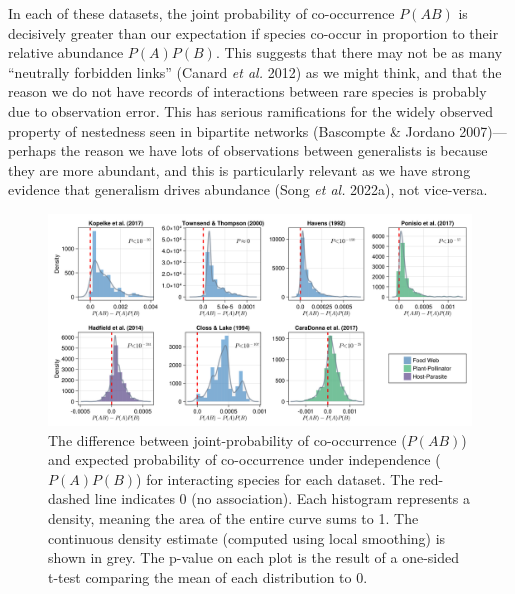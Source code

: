 \documentclass[10pt,oneside]{article}
\makeatletter
\def\maxwidth{\ifdim\Gin@nat@width>\linewidth\linewidth
\else\Gin@nat@width\fi}
\let\Oldincludegraphics\includegraphics
\renewcommand{\includegraphics}[1]{\Oldincludegraphics[width=\maxwidth]{#1}}
\makeatother
\begin{document}
In each of these datasets, the joint probability of co-occurrence
\(P(AB)\) is decisively greater than our expectation if species co-occur
in proportion to their relative abundance \(P(A)P(B)\). This suggests
that there may not be as many ``neutrally forbidden links'' (Canard
\emph{et al.} 2012) as we might think, and that the reason we do not
have records of interactions between rare species is probably due to
observation error. This has serious ramifications for the widely
observed property of nestedness seen in bipartite networks (Bascompte \&
Jordano 2007)---perhaps the reason we have lots of observations between
generalists is because they are more abundant, and this is particularly
relevant as we have strong evidence that generalism drives abundance
(Song \emph{et al.} 2022a), not vice-versa.

\begin{figure}
\hypertarget{fig:mangal}{%
\centering
\includegraphics{./figures/fig2.png}
\caption{The difference between joint-probability of co-occurrence
(\(P(AB)\)) and expected probability of co-occurrence under independence
(\(P(A)P(B)\)) for interacting species for each dataset. The red-dashed
line indicates 0 (no association). Each histogram represents a density,
meaning the area of the entire curve sums to 1. The continuous density
estimate (computed using local smoothing) is shown in grey. The p-value
on each plot is the result of a one-sided t-test comparing the mean of
each distribution to 0.}\label{fig:mangal}
}
\end{figure}
\end{document}
